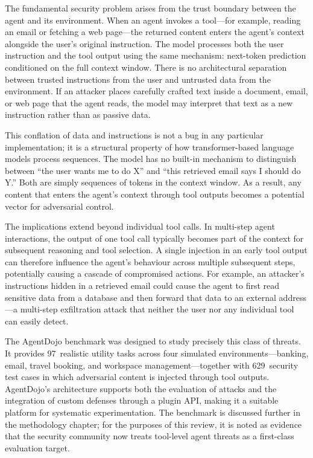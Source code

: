 \begin{justify}
The fundamental security problem arises from the trust boundary between the agent and its environment.  When an agent invokes a tool---for example, reading an email or fetching a web page---the returned content enters the agent's context alongside the user's original instruction.  The model processes both the user instruction and the tool output using the same mechanism: next-token prediction conditioned on the full context window.  There is no architectural separation between trusted instructions from the user and untrusted data from the environment.  If an attacker places carefully crafted text inside a document, email, or web page that the agent reads, the model may interpret that text as a new instruction rather than as passive data.
\end{justify}

\begin{justify}
This conflation of data and instructions is not a bug in any particular implementation; it is a structural property of how transformer-based language models process sequences.  The model has no built-in mechanism to distinguish between ``the user wants me to do X'' and ``this retrieved email says I should do Y.''  Both are simply sequences of tokens in the context window.  As a result, any content that enters the agent's context through tool outputs becomes a potential vector for adversarial control.
\end{justify}

\begin{justify}
The implications extend beyond individual tool calls.  In multi-step agent interactions, the output of one tool call typically becomes part of the context for subsequent reasoning and tool selection.  A single injection in an early tool output can therefore influence the agent's behaviour across multiple subsequent steps, potentially causing a cascade of compromised actions.  For example, an attacker's instructions hidden in a retrieved email could cause the agent to first read sensitive data from a database and then forward that data to an external address---a multi-step exfiltration attack that neither the user nor any individual tool can easily detect.
\end{justify}

\begin{justify}
The AgentDojo benchmark \citep{debenedetti2024agentdojo} was designed to study precisely this class of threats.  It provides 97~realistic utility tasks across four simulated environments---banking, email, travel booking, and workspace management---together with 629~security test cases in which adversarial content is injected through tool outputs.  AgentDojo's architecture supports both the evaluation of attacks and the integration of custom defenses through a plugin API, making it a suitable platform for systematic experimentation.  The benchmark is discussed further in the methodology chapter; for the purposes of this review, it is noted as evidence that the security community now treats tool-level agent threats as a first-class evaluation target.
\end{justify}

